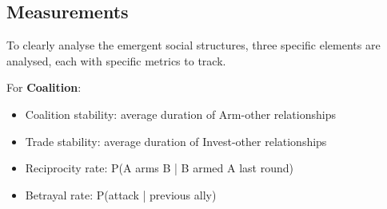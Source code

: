 \subsection{Measurements}
%
%
%
%
%
%

To clearly analyse the emergent social structures, three specific elements are analysed, each with specific metrics to track.

For \textbf{Coalition}:
\begin{itemize}
    \item Coalition stability: average duration of Arm-other relationships
    \item Trade stability: average duration of Invest-other relationships
    \item Reciprocity rate: P(A arms B | B armed A last round)
    \item Betrayal rate: P(attack | previous ally)
\end{itemize}

